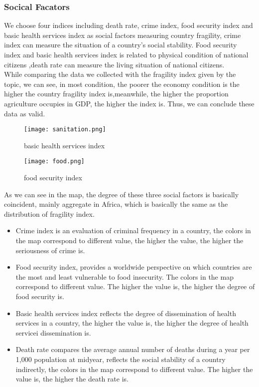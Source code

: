 \documentclass{mcmthesis}
\begin{document}
\subsubsection{Socical Facators}
We choose four indices including death rate, crime index, food security index and basic health services index as social factors measuring country fragility, crime index can measure the situation of a country's social stability. Food security index and basic health services index is related to physical condition of national citizens ,death rate can measure the living situation of national citizens.\\
While comparing the data we collected with the fragility index given by the topic, we can see, in most condition, the poorer the economy condition is the higher the country fragility index is,meanwhile, the higher the proportion agriculture occupies in GDP, the higher the index is. Thus, we can conclude these data as valid.
\begin{figure}[h]
  \centering
  \begin{minipage}[h]{0.48\textwidth}
  \centering
  \texttt{[image: sanitation.png]}
  \caption{basic health services index}
  \end{minipage}
  \begin{minipage}[h]{0.48\textwidth}
  \centering
  \texttt{[image: food.png]}
  \caption{food security index}
  \end{minipage}
\end{figure}
As we can see in the map, the degree of these three social factors is basically coincident, mainly aggregate in Africa, which is basically the same as the distribution of fragility index.
\begin{itemize}
  \item Crime index is an evaluation of criminal frequency in a country, the colors in the map correspond to different value, the higher the value, the higher the seriousness of crime is.
  \item Food security index, provides a worldwide perspective on which countries are the most and least vulnerable to food insecurity. The colors in the map correspond to different value. The higher the value is, the higher the degree of food security is.
  \item Basic health services index reflects the degree of dissemination of health services in a country, the higher the value is, the higher the degree of health servicei dissemination is.
  \item Death rate compares the average annual number of deaths during a year per 1,000 population at midyear, reflects the social stability of a country indirectly, the colors in the map correspond to different value. The higher the value is, the higher the death rate is.
\end{itemize}
\newpage
\end{document}
